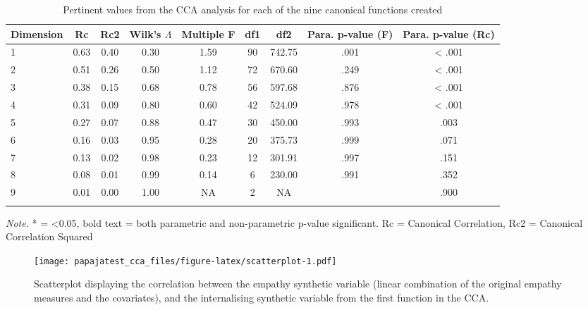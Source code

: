 \documentclass[
  english,
  man,floatsintext]{apa6}
\begin{document}
\begin{table}[tbp]

\begin{center}
\begin{threeparttable}

\caption{\label{tab:ccatable}Pertinent values from the CCA analysis for each of the nine canonical functions created}

\small{

\begin{tabular}{lcccccccc}
\toprule
Dimension & Rc & Rc2 & Wilk’s $\Lambda$ & Multiple F & df1 & df2 & Para. p-value (F) & Para. p-value (Rc)\\
\midrule
1 & 0.63 & 0.40 & 0.30 & 1.59 & 90 & 742.75 & .001 & < .001\\
2 & 0.51 & 0.26 & 0.50 & 1.12 & 72 & 670.60 & .249 & < .001\\
3 & 0.38 & 0.15 & 0.68 & 0.78 & 56 & 597.68 & .876 & < .001\\
4 & 0.31 & 0.09 & 0.80 & 0.60 & 42 & 524.09 & .978 & < .001\\
5 & 0.27 & 0.07 & 0.88 & 0.47 & 30 & 450.00 & .993 & .003\\
6 & 0.16 & 0.03 & 0.95 & 0.28 & 20 & 375.73 & .999 & .071\\
7 & 0.13 & 0.02 & 0.98 & 0.23 & 12 & 301.91 & .997 & .151\\
8 & 0.08 & 0.01 & 0.99 & 0.14 & 6 & 230.00 & .991 & .352\\
9 & 0.01 & 0.00 & 1.00 & NA & 2 & NA &  & .900\\
\bottomrule
\addlinespace
\end{tabular}

}

\begin{tablenotes}[para]
\normalsize{\textit{Note.} * = <0.05, bold text = both parametric and non-parametric p-value significant. Rc = Canonical Correlation, Rc2 = Canonical Correlation Squared}
\end{tablenotes}

\end{threeparttable}
\end{center}

\end{table}



\begin{figure}
\centering
\texttt{[image: papajatest\_cca\_files/figure-latex/scatterplot-1.pdf]}
\caption{\label{fig:scatterplot}Scatterplot displaying the correlation between the empathy synthetic variable (linear combination of the original empathy measures and the covariates), and the internalising synthetic variable from the first function in the CCA.}
\end{figure}
\end{document}
